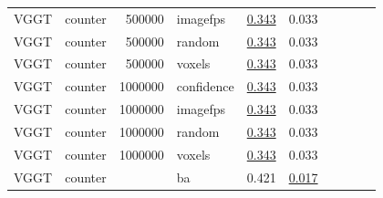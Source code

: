 \begin{table}[H]
\begin{tabular}{llrlrrrrrr}
VGGT & counter & 500000 & imagefps & \underline{0.343} & 0.033 &  &  &  &  \\
VGGT & counter & 500000 & random & \underline{0.343} & 0.033 &  &  &  &  \\
VGGT & counter & 500000 & voxels & \underline{0.343} & 0.033 &  &  &  &  \\
VGGT & counter & 1000000 & confidence & \underline{0.343} & 0.033 &  &  &  &  \\
VGGT & counter & 1000000 & imagefps & \underline{0.343} & 0.033 &  &  &  &  \\
VGGT & counter & 1000000 & random & \underline{0.343} & 0.033 &  &  &  &  \\
VGGT & counter & 1000000 & voxels & \underline{0.343} & 0.033 &  &  &  &  \\
VGGT & counter &  & ba & 0.421 & \underline{0.017} &  &  &  &  \\
\bottomrule
\end{tabular}
\end{table}
